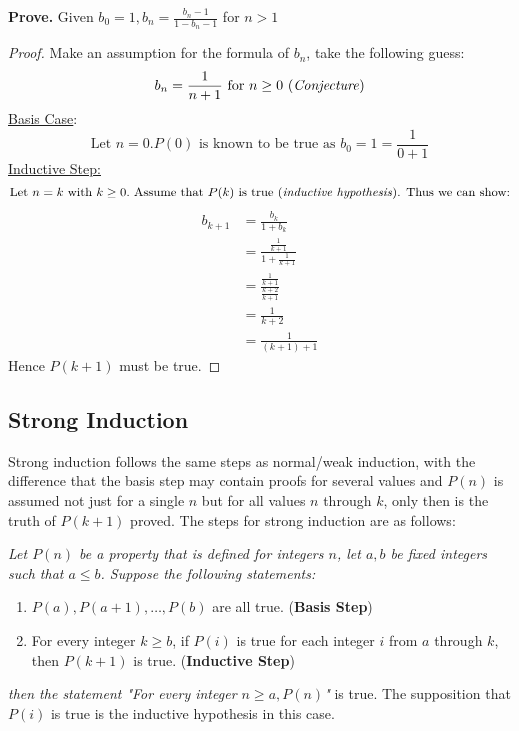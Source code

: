 \documentclass[a4paper]{article}
\begin{document}
  \textbf{Prove.} Given $b_0 = 1, b_n = \frac{b_n -1 }{1 - b_n -1}$ for $n>1$
  \begin{proof}
    Make an assumption for the formula of $b_n$, take the following guess:
    \begin{displaymath}
      b_n = \frac{1 }{n+1} \textrm{ for } n \geq 0 \textrm{ (\textit{Conjecture})}
    \end{displaymath}
    \underline{Basis Case}:
    \begin{displaymath}
      \textrm{Let } n = 0. P(0) \textrm{ is known to be true as } b_0 = 1 = \frac{1 }{0+1}
    \end{displaymath}
    \underline{Inductive Step:}
    \[
      \textrm{Let } n = k \textrm{ with } k \geq 0. \textrm{ Assume that $P(k)$ is true (\textit{inductive hypothesis}). Thus we can show:}
    \]
    \begin{displaymath}
      \begin{split}
        b_{k+1} &= \frac{b_k }{1+ b_k} \\
                &= \frac{\frac{1 }{k+1}}{1 + \frac{1 }{k+1}}\\
                &= \frac{\frac{1 }{k+1 }}{\frac{k+2 }{k+1}} \\
                &= \frac{1 }{k+2} \\
                &= \frac{1 }{(k+1)+1}
      \end{split}
    \end{displaymath}
    Hence $P(k+1)$ must be true.
  \end{proof}
  
  \subsection{Strong Induction}
  Strong induction follows the same steps as normal/weak induction, with the difference that the basis step may contain proofs for several values and $P(n)$ is assumed not just for a single $n$ but for all values $n$ through $k$, only then is the truth of $P(k+1)$ proved. The steps for strong induction are as follows:

  \textit{Let $P(n)$ be a property that is defined for integers $n$, let $a,b$ be fixed integers such that $a \le b$. Suppose the following statements:}
  \begin{enumerate}
    \item $P(a), P(a+1),\dots,P(b)$ are all true. (\textbf{Basis Step})
    \item For every integer $k \geq b$, if $P(i)$ is true for each integer $i$ from $a$ through $k$, then $P(k+1)$ is true. (\textbf{Inductive Step})
  \end{enumerate}
  \textit{then the statement "For every integer $n \geq a, P(n)$"} is true. The supposition that $P(i)$ is true is the inductive hypothesis in this case.
  
\end{document}
